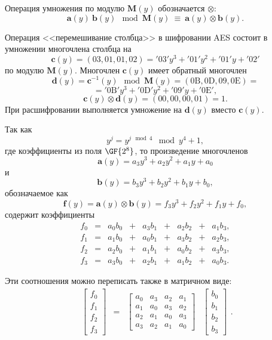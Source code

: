 Операция умножения по модулю $\mathbf{M}(y)$ обозначается $\otimes$:
    \[ \mathbf{a}(y) ~ \mathbf{b}(y) \mod \mathbf{M}(y) ~\equiv~ \mathbf{a}(y) \otimes \mathbf{b}(y). \]

Операция <<перемешивание столбца>> в шифровании AES состоит в умножении многочлена столбца на
    \[ \mathbf{c}(y) = (03, 01, 01, 02) = \mathrm{'03'} y^3 + \mathrm{'01'} y^2 + \mathrm{'01'} y + \mathrm{'02'} \]
по модулю $\mathbf{M}(y)$. Многочлен $\mathbf{c}(y)$ имеет обратный многочлен
    \[ \mathbf{d}(y) = \mathbf{c}^{-1}(y) \mod \mathbf{M}(y) = (\mathrm{0B}, \mathrm{0D}, \mathrm{09}, \mathrm{0E}) = \]
        \[ = \mathrm{'0B'} y^3 + \mathrm{'0D'} y^2 + \mathrm{'09'} y + \mathrm{'0E'}, \]
    \[ \mathbf{c}(y) \otimes \mathbf{d}(y) = (00, 00, 00, 01) = 1. \]
При расшифровании выполняется умножение на $\mathbf{d}(y)$ вместо $\mathbf{c}(y)$.

Так как
    \[ y^j = y^{j \mod 4} \mod y^4+1, \]
где коэффициенты из поля $\GF{2^8}$, то произведение многочленов
    \[ \mathbf{a}(y) = a_{3}y^{3}+ a_{2}y^{2} + a_{1}y + a_{0} \]
и
    \[ \mathbf{b}(y) = b_{3}y^{3} + b_{2}y^{2} + b_{1}y + b_{0}, \]
обозначаемое как
    \[ \mathbf{f}(y) = \mathbf{a}(y) \otimes \mathbf{b}(y) = f_{3}y^{3} + f_{2}y^{2} + f_{1}y + f_{0}, \]
содержит коэффициенты
\[
    \begin{array}{ccccccccc}
        f_{0} & = & a_{0}b_{0} & + & a_{3}b_{1} & + & a_{2}b_{2} & + & a_{1}b_{3}, \\
        f_{1} & = & a_{1}b_{0} & + & a_{0}b_{1} & + & a_{3}b_{2} & + & a_{2}b_{3}, \\
        f_{2} & = & a_{2}b_{0} & + & a_{1}b_{1} & + & a_{0}b_{2} & + & a_{3}b_{3}, \\
        f_{3} & = & a_{3}b_{0} & + & a_{2}b_{1} & + & a_{1}b_{2} & + &  a_{0}b_{3}.
    \end{array}
\]

Эти соотношения можно переписать также в матричном виде:
\[
    \begin{array}{cccc}
        \left[ \begin{array}{c}
            f_{0} \\
            f_{1} \\
            f_{2} \\
            f_{3}
        \end{array} \right] &  = & \left[\begin{array}{cccc}
            a_{0} & a_{3} & a_{2} & a_{1} \\
            a_{1} & a_{0} & a_{3} & a_{2} \\
            a_{2} & a_{1} & a_{0} & a_{3} \\
            a_{3} & a_{2} & a_{1} & a_{0}
        \end{array}\right] & \left[\begin{array}{c}
            b_{0} \\
            b_{1} \\
            b_{2} \\
            b_{3}
        \end{array} \right]
    \end{array}.
\]

